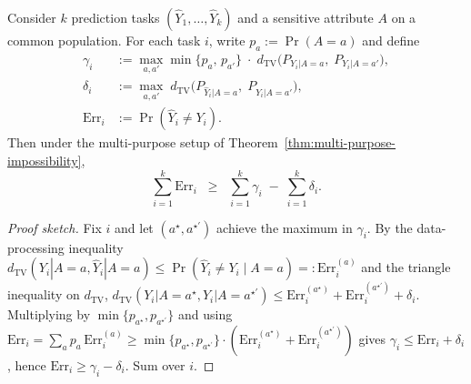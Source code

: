 
\begin{corollary}
\label{cor:dtv-multi-purpose}
Consider $k$ prediction tasks $(\widehat{Y}_1, \ldots, \widehat{Y}_k)$ and a sensitive attribute $A$
on a common population. For each task $i$, write $p_a := \Pr(A{=}a)$ and define
\begin{align*}
\gamma_i &:= \max_{a,a'} \min\{p_a,\,p_{a'}\}\;\cdot\;d_{\mathrm{TV}}\!\big(P_{Y_i|A=a},\;P_{Y_i|A=a'}\big), \\
\delta_i &:= \max_{a,a'}\; d_{\mathrm{TV}}\!\big(P_{\widehat{Y}_i|A=a},\;P_{\widehat{Y}_i|A=a'}\big), \\
\mathrm{Err}_i &:= \Pr(\widehat{Y}_i \neq Y_i).
\end{align*}
Then under the multi-purpose setup of Theorem~\ref{thm:multi-purpose-impossibility},
\begin{equation}
\sum_{i=1}^{k} \mathrm{Err}_i \;\;\geq\;\; \sum_{i=1}^{k} \gamma_i \;-\; \sum_{i=1}^{k} \delta_i.
\label{eq:dtv-bound}
\end{equation}
\end{corollary}

\begin{proof}[Proof sketch]
Fix $i$ and let $(a^\star,a^{\star\prime})$ achieve the maximum in $\gamma_i$. By the
data-processing inequality $d_{\mathrm{TV}}(Y_i|A{=}a,\widehat{Y}_i|A{=}a) \leq \Pr(\widehat{Y}_i \neq Y_i \mid A{=}a) =: \mathrm{Err}_i^{(a)}$
and the triangle inequality on $d_{\mathrm{TV}}$,
$d_{\mathrm{TV}}(Y_i|A{=}a^\star, Y_i|A{=}a^{\star\prime}) \leq \mathrm{Err}_i^{(a^\star)} + \mathrm{Err}_i^{(a^{\star\prime})} + \delta_i$.
Multiplying by $\min\{p_{a^\star},p_{a^{\star\prime}}\}$ and using
$\mathrm{Err}_i = \sum_a p_a\,\mathrm{Err}_i^{(a)} \geq \min\{p_{a^\star},p_{a^{\star\prime}}\}\cdot(\mathrm{Err}_i^{(a^\star)} + \mathrm{Err}_i^{(a^{\star\prime})})$
gives $\gamma_i \leq \mathrm{Err}_i + \delta_i$, hence $\mathrm{Err}_i \geq \gamma_i - \delta_i$. Sum over $i$.
\end{proof}

